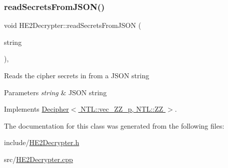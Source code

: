 \subsubsection{\texorpdfstring{read\+Secrets\+From\+J\+S\+O\+N()}{readSecretsFromJSON()}}
{\footnotesize\ttfamily void H\+E2\+Decrypter\+::read\+Secrets\+From\+J\+S\+ON (\begin{DoxyParamCaption}\item[{std\+::string \&}]{string }\end{DoxyParamCaption})\hspace{0.3cm}{\ttfamily [override]}, {\ttfamily [virtual]}}

Reads the cipher secrets in from a J\+S\+ON string 
\begin{DoxyParams}{Parameters}
{\em string} & J\+S\+ON string \\
\hline
\end{DoxyParams}


Implements \hyperlink{classDecipher_a39aea002012130201e12a8fa7d84dda5}{Decipher$<$ N\+T\+L\+::vec\+\_\+\+Z\+Z\+\_\+p, N\+T\+L\+::\+Z\+Z $>$}.



The documentation for this class was generated from the following files\+:\begin{DoxyCompactItemize}
\item 
include/\hyperlink{HE2Decrypter_8h}{H\+E2\+Decrypter.\+h}\item 
src/\hyperlink{HE2Decrypter_8cpp}{H\+E2\+Decrypter.\+cpp}\end{DoxyCompactItemize}
